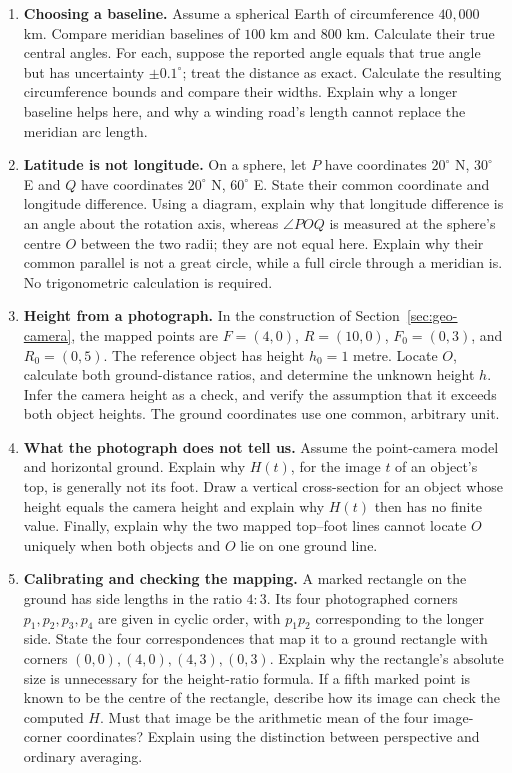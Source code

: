 \begin{enumerate}
\item \textbf{Choosing a baseline.} Assume a spherical Earth of
circumference $40{,}000$ km. Compare meridian baselines of $100$ km and
$800$ km. Calculate their true central angles. For each, suppose the
reported angle equals that true angle but has uncertainty $\pm0.1^\circ$;
treat the distance as exact. Calculate the resulting circumference bounds
and compare their widths. Explain why a longer baseline helps here, and
why a winding road's length cannot replace the meridian arc length.

\item \textbf{Latitude is not longitude.} On a sphere, let $P$ have
coordinates $20^\circ$ N, $30^\circ$ E and $Q$ have coordinates
$20^\circ$ N, $60^\circ$ E. State their common coordinate and longitude
difference. Using a diagram, explain why that longitude difference is an
angle about the rotation axis, whereas $\angle POQ$ is measured at the
sphere's centre $O$ between the two radii; they are not equal here.
Explain why their common parallel is not a great circle, while a full
circle through a meridian is. No trigonometric calculation is required.

\item \textbf{Height from a photograph.} In the construction of
Section~\ref{sec:geo-camera}, the mapped points are
$F=(4,0)$, $R=(10,0)$, $F_0=(0,3)$, and $R_0=(0,5)$.
The reference object has height $h_0=1$ metre. Locate $O$, calculate both
ground-distance ratios, and determine the unknown height $h$. Infer the
camera height as a check, and verify the assumption that it exceeds both
object heights. The ground coordinates use one common, arbitrary unit.

\item \textbf{What the photograph does not tell us.} Assume the
point-camera model and horizontal ground. Explain why $H(t)$, for the
image $t$ of an object's top, is generally not its foot. Draw a vertical
cross-section for an object whose height equals the camera height and
explain why $H(t)$ then has no finite value. Finally, explain why the two
mapped top--foot lines cannot locate $O$ uniquely when both objects and
$O$ lie on one ground line.

\item \textbf{Calibrating and checking the mapping.} A marked rectangle
on the ground has side lengths in the ratio $4:3$. Its four photographed
corners $p_1,p_2,p_3,p_4$ are given in cyclic order, with $p_1p_2$
corresponding to the longer side. State the four correspondences that
map it to a ground rectangle with corners $(0,0),(4,0),(4,3),(0,3)$.
Explain why the rectangle's absolute size is unnecessary for the
height-ratio formula. If a fifth marked point is known to be the centre
of the rectangle, describe how its image can check the computed $H$.
Must that image be the arithmetic mean of the four image-corner
coordinates? Explain using the distinction between perspective and
ordinary averaging.


\end{enumerate}
